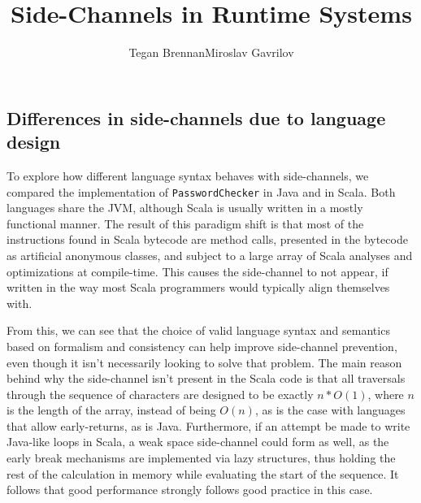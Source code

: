 \documentclass{article}
\begin{document}
     
\title{Side-Channels in Runtime Systems}
\author{Tegan Brennan\qquad Miroslav Gavrilov}
\maketitle








\subsection{Differences in side-channels due to language design}

To explore how different language syntax behaves with side-channels, we compared the implementation of \texttt{PasswordChecker} in Java and in Scala. Both languages share the JVM, although Scala is usually written in a mostly functional manner. The result of this paradigm shift is that most of the instructions found in Scala bytecode are method calls, presented in the bytecode as artificial anonymous classes, and subject to a large array of Scala analyses and optimizations at compile-time. This causes the side-channel to not appear, if written in the way most Scala programmers would typically align themselves with.


From this, we can see that the choice of valid language syntax and semantics based on formalism and consistency can help improve side-channel prevention, even though it isn't necessarily looking to solve that problem. The main reason behind why the side-channel isn't present in the Scala code is that all traversals through the sequence of characters are designed to be exactly $n * O(1)$, where $n$ is the length of the array, instead of being $O(n)$, as is the case with languages that allow early-returns, as is Java. Furthermore, if an attempt be made to write Java-like loops in Scala, a weak space side-channel could form as well, as the early break mechanisms are implemented via lazy structures, thus holding the rest of the calculation in memory while evaluating the start of the sequence. It follows that good performance strongly follows good practice in this case.



\pagebreak



\pagebreak

\end{document}
